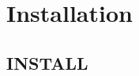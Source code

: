 \section{Installation}
\label{group__install}
\subsection{INSTALL}\label{group__install_install}


\begin{DocInclude}\begin{verbatim}\end{verbatim}
\end{DocInclude}
 